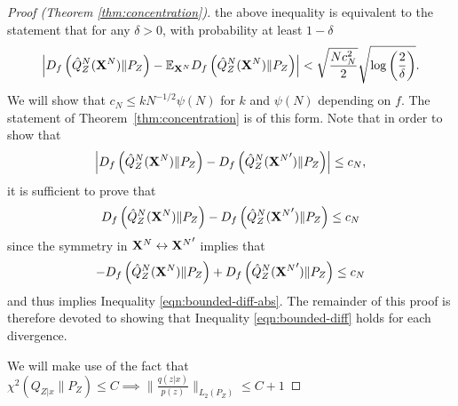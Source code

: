 \begin{proof}[Proof (Theorem \ref{thm:concentration})]
the above inequality is equivalent to the statement that for any $\delta>0$, with probability at least $1-\delta$ 
\begin{align*}
    \left| D_f\left( \hat{Q}_Z^N(\mathbf{X}^N) \| P_Z\right) - \mathbb{E}_{\mathbf{X}^N} D_f\left( \hat{Q}_Z^N(\mathbf{X}^N) \| P_Z\right) \right| < \sqrt{\frac{Nc_N^2}{2}} \sqrt{\log\left(\frac{2}{\delta}\right)}.
\end{align*}
We will show that $c_N \leq k N^{-1/2} \psi(N)$ for $k$ and $\psi(N)$ depending on $f$.
The statement of Theorem~\ref{thm:concentration} is of this form.
Note that in order to show that
\begin{align}\label{eqn:bounded-diff-abs}
    \left|D_f\left( \hat{Q}_Z^N(\mathbf{X}^N) \| P_Z\right) - D_f\left( \hat{Q}_Z^N({\mathbf{X}^N}') \| P_Z\right)\right| \leq c_N,
\end{align}
it is sufficient to prove that 
\begin{align}\label{eqn:bounded-diff}
     D_f\left( \hat{Q}_Z^N(\mathbf{X}^N) \| P_Z\right) - D_f\left( \hat{Q}_Z^N({\mathbf{X}^N}') \| P_Z\right) \leq c_N
\end{align}
since the symmetry in $\mathbf{X}^N \leftrightarrow {\mathbf{X}^N}'$ implies that
\begin{align}
    - D_f\left( \hat{Q}_Z^N(\mathbf{X}^N) \| P_Z\right) + D_f\left( \hat{Q}_Z^N({\mathbf{X}^N}') \| P_Z\right) \leq c_N
\end{align}
and thus implies Inequality \ref{eqn:bounded-diff-abs}.
The remainder of this proof is therefore devoted to showing that Inequality \ref{eqn:bounded-diff} holds for each divergence.

We will make use of the fact that $\chi^2\left(Q_{Z|x} \| P_Z\right) \leq C \implies \bigl\| \frac{q(z|x)}{p(z)} \bigr\|_{L_2(P_Z)} \leq C+1 $


\end{proof}
